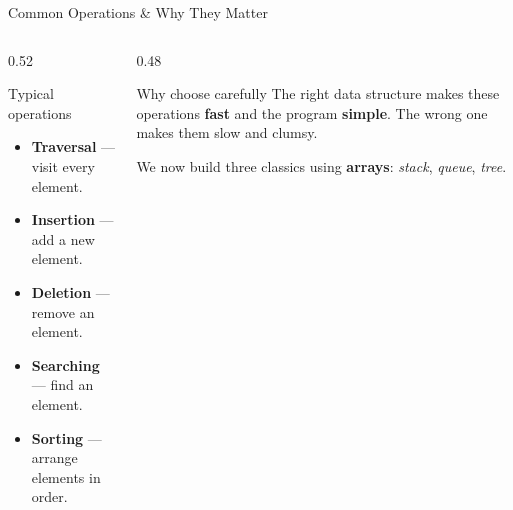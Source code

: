\documentclass[aspectratio=169]{beamer}
\begin{document}
	\begin{frame}{Common Operations \& Why They Matter}
		\begin{columns}[T]
			\begin{column}{0.52\textwidth}
				\begin{block}{Typical operations}
					\begin{itemize}\small
						\item \textbf{Traversal} --- visit every element.
						\item \textbf{Insertion} --- add a new element.
						\item \textbf{Deletion} --- remove an element.
						\item \textbf{Searching} --- find an element.
						\item \textbf{Sorting} --- arrange elements in order.
					\end{itemize}
				\end{block}
			\end{column}
			\begin{column}{0.48\textwidth}
				\begin{block}{Why choose carefully}
					\small The right data structure makes these operations \textbf{fast} and the program
					\textbf{simple}. The wrong one makes them slow and clumsy.
				\end{block}
				\centering\footnotesize We now build three classics using \textbf{arrays}: \emph{stack}, \emph{queue}, \emph{tree}.
			\end{column}
		\end{columns}
	\end{frame}

\end{document}
